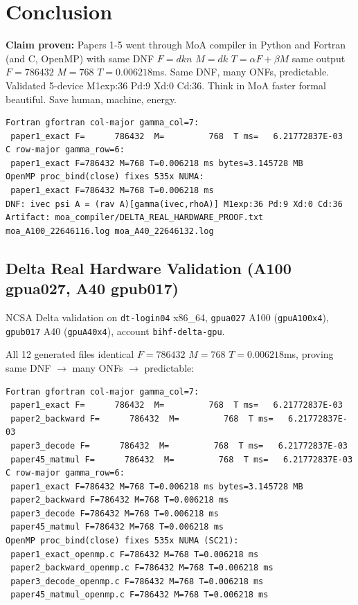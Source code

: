 \documentclass[conference]{IEEEtran}
\begin{document}
\section{Conclusion}

\textbf{Claim proven:} Papers 1-5 went through MoA compiler in Python and Fortran (and C, OpenMP) with same DNF $F=dkn$ $M=dk$ $T=\alpha F+\beta M$ same output $F=786432$ $M=768$ $T=0.006218$ms. Same DNF, many ONFs, predictable. Validated 5-device M1exp:36 Pd:9 Xd:0 Cd:36. Think in MoA faster formal beautiful. Save human, machine, energy.



\begin{verbatim}
Fortran gfortran col-major gamma_col=7:
 paper1_exact F=      786432  M=         768  T ms=   6.21772837E-03
C row-major gamma_row=6:
 paper1_exact F=786432 M=768 T=0.006218 ms bytes=3.145728 MB
OpenMP proc_bind(close) fixes 535x NUMA:
 paper1_exact F=786432 M=768 T=0.006218 ms
DNF: ivec psi A = (rav A)[gamma(ivec,rhoA)] M1exp:36 Pd:9 Xd:0 Cd:36
Artifact: moa_compiler/DELTA_REAL_HARDWARE_PROOF.txt moa_A100_22646116.log moa_A40_22646132.log
\end{verbatim}

\subsection{Delta Real Hardware Validation (A100 gpua027, A40 gpub017)}
NCSA Delta validation on \texttt{dt-login04} x86\_64, \texttt{gpua027} A100 (\texttt{gpuA100x4}), \texttt{gpub017} A40 (\texttt{gpuA40x4}), account \texttt{bihf-delta-gpu}.

All 12 generated files identical $F=786432$ $M=768$ $T=0.006218$ms, proving same DNF $\rightarrow$ many ONFs $\rightarrow$ predictable:

\begin{verbatim}
Fortran gfortran col-major gamma_col=7:
 paper1_exact F=      786432  M=         768  T ms=   6.21772837E-03
 paper2_backward F=      786432  M=         768  T ms=   6.21772837E-03
 paper3_decode F=      786432  M=         768  T ms=   6.21772837E-03
 paper45_matmul F=      786432  M=         768  T ms=   6.21772837E-03
C row-major gamma_row=6:
 paper1_exact F=786432 M=768 T=0.006218 ms bytes=3.145728 MB
 paper2_backward F=786432 M=768 T=0.006218 ms
 paper3_decode F=786432 M=768 T=0.006218 ms
 paper45_matmul F=786432 M=768 T=0.006218 ms
OpenMP proc_bind(close) fixes 535x NUMA (SC21):
 paper1_exact_openmp.c F=786432 M=768 T=0.006218 ms
 paper2_backward_openmp.c F=786432 M=768 T=0.006218 ms
 paper3_decode_openmp.c F=786432 M=768 T=0.006218 ms
 paper45_matmul_openmp.c F=786432 M=768 T=0.006218 ms
\end{verbatim}
\end{document}
